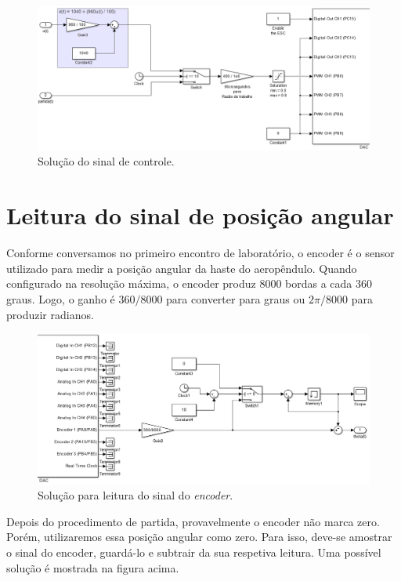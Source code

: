 \documentclass[a4paper,12pt]{exam}
\begin{document}
\begin{figure}[H]
    \centering
    \includegraphics[width=14cm]{figs/solucao_dac1.png}
    \caption{Solução do sinal de controle.}
    \label{fig:solucao-sinal-controle}
\end{figure}


\section{Leitura do sinal de posição angular}

Conforme conversamos no primeiro encontro de laboratório, o encoder é o sensor utilizado para medir a posição angular da haste do aeropêndulo. Quando configurado na resolução máxima, o encoder produz 8000 bordas a cada 360 graus. Logo, o ganho é $360 / 8000$ para converter para graus ou $2\pi / 8000$ para produzir radianos.

\begin{figure}[H]
    \centering
    \includegraphics[width=14cm]{figs/solucao_dac2.png}
    \caption{Solução para leitura do sinal do \textit{encoder}.}
    \label{fig:solucao-sinal-encoder}
\end{figure}

Depois do procedimento de partida, provavelmente o encoder não marca zero. Porém, utilizaremos essa posição angular como zero. Para isso, deve-se amostrar o sinal do encoder, guardá-lo e subtrair da sua respetiva leitura. Uma possível solução é mostrada na figura acima.
\end{document}
